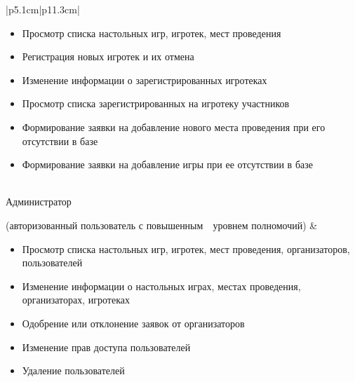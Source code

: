 \begin{table}[h!]
\begin{center}
\begin{threeparttable}
\begin{tabular}{|p{5.1cm}|p{11.3cm}|}
\begin{minipage}[t]{\linewidth}
                      \begin{itemize}[nosep,after=\strut]
                          \item Просмотр списка настольных игр, игротек, мест
                        проведения
                          \item Регистрация новых игротек и их отмена
                          \item Изменение информации о зарегистрированных
                              игротеках
                          \item Просмотр списка зарегистрированных на
                              \mbox{игротеку} участников
                          \item Формирование заявки на добавление нового
                              \mbox{места} проведения при его отсутствии в базе
                          \item Формирование заявки на добавление игры при ее
                        отсутствии в базе
                      \end{itemize}
                  \end{minipage}\\
            \hline
            Администратор \par (авторизованный пользователь
                    с \mbox{повышенным~~уровнем} полномочий)
                  & \begin{minipage}[t]{\linewidth}
                      \begin{itemize}[nosep,after=\strut]
                          \item Просмотр списка настольных игр, игротек, мест
                        проведения, организаторов, пользователей
                    \item Изменение информации о настольных играх, \mbox{местах}
                        проведения, организаторах, игротеках
                          \item Одобрение или отклонение заявок от
                              \mbox{организаторов}
                          \item Изменение прав доступа пользователей
                          \item Удаление пользователей
                      \end{itemize}
                  \end{minipage}\\
            \hline
        \end{tabular}
    \end{threeparttable}
    \end{center}
\end{table} 

